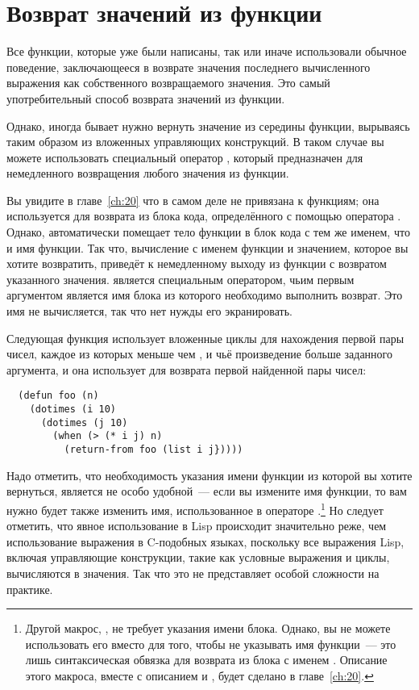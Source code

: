 \section{Возврат значений из функции}

Все функции, которые уже были написаны, так или иначе использовали обычное поведение,
заключающееся в возврате значения последнего вычисленного выражения как собственного
возвращаемого значения.  Это самый употребительный способ возврата значений из функции.

Однако, иногда бывает нужно вернуть значение из середины функции, вырываясь таким образом
из вложенных управляющих конструкций.  В таком случае вы можете использовать специальный
оператор , который предназначен для немедленного возвращения любого
значения из функции.

Вы увидите в главе~\ref{ch:20} что  в самом деле не привязана к функциям; она
используется для возврата из блока кода, определённого с помощью оператора .
Однако,  автоматически помещает тело функции в блок кода с тем же именем, что и
имя функции.  Так что, вычисление  с именем функции и значением, которое вы
хотите возвратить, приведёт к немедленному выходу из функции с возвратом указанного
значения.   является специальным оператором, чьим первым аргументом
является имя блока из которого необходимо выполнить возврат.  Это имя не вычисляется, так
что нет нужды его экранировать.

Следующая функция использует вложенные циклы для нахождения первой пары чисел, каждое из
которых меньше чем , и чьё произведение больше заданного аргумента, и она использует
 для возврата первой найденной пары чисел:

\begin{lstlisting}
  (defun foo (n)
    (dotimes (i 10)
      (dotimes (j 10)
        (when (> (* i j) n)
          (return-from foo (list i j}))))
\end{lstlisting}

Надо отметить, что необходимость указания имени функции из которой вы хотите вернуться,
является не особо удобной~--- если вы измените имя функции, то вам нужно будет также
изменить имя, использованное в операторе .\footnote{Другой макрос,
  , не требует указания имени блока.  Однако, вы не можете использовать его
  вместо  для того, чтобы не указывать имя функции~--- это лишь
  синтаксическая обвязка для возврата из блока с именем .  Описание этого
  макроса, вместе с описанием  и , будет сделано в
  главе~\ref{ch:20}.}  Но следует отметить, что явное использование
   в Lisp происходит значительно реже, чем использование
  выражения  в C-подобных языках, поскольку
все выражения Lisp, включая управляющие конструкции, такие как условные выражения и циклы,
вычисляются в значения.  Так что это не представляет особой сложности на практике.

